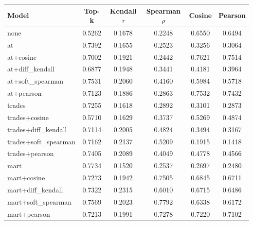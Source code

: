\begin{tabular}{lccccc}
\toprule
Model & Top-k & Kendall $\tau$ & Spearman $\rho$ & Cosine & Pearson \\
\midrule
none & 0.5262 & 0.1678 & 0.2248 & 0.6550 & 0.6494 \\
at & 0.7392 & 0.1655 & 0.2523 & 0.3256 & 0.3064 \\
at+cosine & 0.7002 & 0.1921 & 0.2442 & 0.7621 & 0.7514 \\
at+diff_kendall & 0.6877 & 0.1948 & 0.3441 & 0.4181 & 0.3964 \\
at+soft_spearman & 0.7531 & 0.2060 & 0.4160 & 0.5984 & 0.5718 \\
at+pearson & 0.7123 & 0.1886 & 0.2863 & 0.7532 & 0.7432 \\
trades & 0.7255 & 0.1618 & 0.2892 & 0.3101 & 0.2873 \\
trades+cosine & 0.5710 & 0.1629 & 0.3737 & 0.5269 & 0.4874 \\
trades+diff_kendall & 0.7114 & 0.2005 & 0.4824 & 0.3494 & 0.3167 \\
trades+soft_spearman & 0.7162 & 0.2137 & 0.5209 & 0.1915 & 0.1418 \\
trades+pearson & 0.7405 & 0.2089 & 0.4049 & 0.4778 & 0.4566 \\
mart & 0.7734 & 0.1520 & 0.2537 & 0.2697 & 0.2480 \\
mart+cosine & 0.7273 & 0.1942 & 0.7505 & 0.6845 & 0.6711 \\
mart+diff_kendall & 0.7322 & 0.2315 & 0.6010 & 0.6715 & 0.6486 \\
mart+soft_spearman & 0.7569 & 0.2023 & 0.7792 & 0.6338 & 0.6172 \\
mart+pearson & 0.7213 & 0.1991 & 0.7278 & 0.7220 & 0.7102 \\
\bottomrule
\end{tabular}
